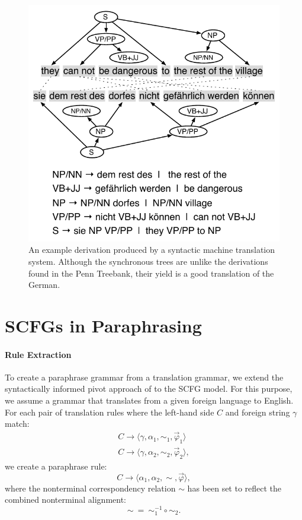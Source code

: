 \documentclass[11pt]{article}
\begin{document}
\begin{figure}[t]
\begin{center}
\includegraphics[width=0.99\linewidth]{figures/example_translation-2.pdf}
\end{center}
\caption{An example derivation produced by a syntactic machine
  translation system.  Although the synchronous trees are unlike the
  derivations found in the Penn Treebank, their yield is a good
  translation of the German.}
\label{example_translation}
\end{figure}


\section{SCFGs in Paraphrasing} \label{acquisition}


\paragraph{Rule Extraction}

To create a paraphrase grammar from a translation grammar, we extend
the syntactically informed pivot approach of
 to the SCFG model. For this purpose, we
assume a grammar that translates from a given foreign language to
English. For each pair of translation rules where the left-hand side
$C$ and foreign string $\gamma$ match:
\begin{eqnarray*}
  C \rightarrow \langle \gamma, \alpha_1, \sim_1, \vec{\varphi}_1 \rangle \\
  C \rightarrow \langle \gamma, \alpha_2, \sim_2, \vec{\varphi}_2 \rangle ,
\end{eqnarray*}
we create a paraphrase rule:
\begin{equation*}
C \rightarrow \langle \alpha_1, \alpha_2, \sim, \vec{\varphi} \rangle ,
\end{equation*}
where the nonterminal correspondency relation $\sim$ has been set to
reflect the combined nonterminal alignment:
\begin{equation*}
\sim ~ = ~ \sim_1^{-1} \circ \sim_2 .
\end{equation*}
\end{document}
